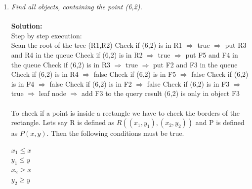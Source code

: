 \begin{enumerate}
\begin{center}
    \end{center}
\item
  {\em Find all objects, containing the point (6,2).}\\\\
  {\bf Solution:}\\
  Step by step execution:\\
  \subitem
  Scan the root of the tree (R1,R2)
  \subitem
  Check if (6,2) is in R1 $\Rightarrow$ true $\Rightarrow$ put R3 and R4 in the queue
  \subitem
  Check if (6,2) is in R2 $\Rightarrow$ true $\Rightarrow$ put F5 and F4 in the queue
  \subitem
  Check if (6,2) is in R3 $\Rightarrow$ true $\Rightarrow$ put F2 and F3 in the queue
  \subitem
  Check if (6,2) is in R4 $\Rightarrow$ false
  \subitem
  Check if (6,2) is in F5 $\Rightarrow$ false
  \subitem
  Check if (6,2) is in F4 $\Rightarrow$ false
  \subitem
  Check if (6,2) is in F2 $\Rightarrow$ false
  \subitem
  Check if (6,2) is in F3 $\Rightarrow$ true $\Rightarrow$ leaf node $\Rightarrow$ add F3 to the query result
  {\subitem
  (6,2) is only in object F3}\\\\
  To check if a point is inside a rectangle we have to check the borders of the rectangle. Lets say R is defined as $R((x_1,y_1),(x_2,y_2))$
  and P is defined as $P(x,y)$. 
  Then the following conditions must be true.
  \begin{center}
    $x_1 \leq x $\\
    $y_1 \leq y $\\
    $x_2 \geq x $\\
    $y_2 \geq y $\\
  \end{center}


\end{enumerate}
